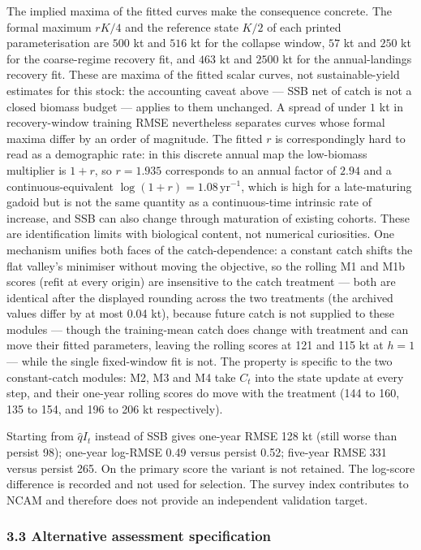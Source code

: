 \documentclass[11pt]{article}
\begin{document}
The implied maxima of the fitted curves make the consequence concrete.
The formal maximum \(rK/4\) and the reference state \(K/2\) of each
printed parameterisation are \(500\) kt and \(516\) kt for the collapse
window, \(57\) kt and \(250\) kt for the coarse-regime recovery fit, and
\(463\) kt and \(2500\) kt for the annual-landings recovery fit. These
are maxima of the fitted scalar curves, not sustainable-yield estimates
for this stock: the accounting caveat above --- SSB net of catch is not
a closed biomass budget --- applies to them unchanged. A spread of under
\(1\) kt in recovery-window training RMSE nevertheless separates curves
whose formal maxima differ by an order of magnitude. The fitted \(r\) is
correspondingly hard to read as a demographic rate: in this discrete
annual map the low-biomass multiplier is \(1+r\), so \(r = 1.935\)
corresponds to an annual factor of \(2.94\) and a continuous-equivalent
\(\log(1+r) = 1.08\,\mathrm{yr}^{-1}\), which is high for a
late-maturing gadoid but is not the same quantity as a continuous-time
intrinsic rate of increase, and SSB can also change through maturation
of existing cohorts. These are identification limits with biological
content, not numerical curiosities. One mechanism
unifies both faces of the catch-dependence: a constant catch shifts the
flat valley's minimiser without moving the objective, so the rolling
M1 and M1b scores (refit at every origin) are insensitive to the catch
treatment --- both are identical after the displayed rounding across the two
treatments (the archived values differ by at most 0.04 kt), because
future catch is not supplied to these modules --- though the
training-mean catch does change with treatment and can move their fitted
parameters, leaving the rolling scores at 121 and 115 kt at
\(h=1\) --- while the single
fixed-window fit is not. The property is specific to the two
constant-catch modules: M2, M3 and M4 take \(C_t\) into the state
update at every step, and their one-year rolling scores do move with the
treatment (144 to 160, 135 to 154, and 196 to 206 kt respectively).

Starting from \(\hat q I_t\) instead of SSB gives one-year RMSE 128 kt
(still worse than persist 98); one-year log-RMSE 0.49 versus persist
0.52; five-year RMSE 331 versus persist 265. On the primary score the
variant is not retained. The log-score difference is recorded and not
used for selection. The survey index contributes to NCAM and therefore
does not provide an independent validation target.

\subsubsection{3.3 Alternative assessment
specification}\label{alternative-assessment-specification}
\end{document}
